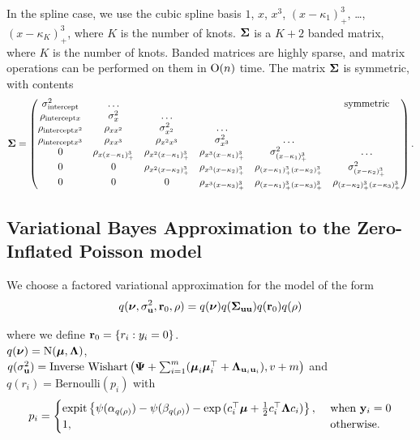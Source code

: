 
In the spline case, we use the cubic spline basis $1$, $x$, $x^3$, $(x - \kappa_1)^3_+$, \ldots, $(x -
\kappa_K)^3_+$, where $K$ is the number of knots. ${\boldsymbol \Sigma}$ is a $K + 2$ banded matrix, where $K$ is the
number of knots. Banded matrices are highly sparse, and matrix operations can be performed on them in
$\text{O}(n)$ time. The matrix ${\boldsymbol \Sigma}$ is symmetric, with contents
\[
	{\boldsymbol \Sigma} =
	\begin{pmatrix}
		\sigma^2_{\text{intercept}} & \ldots                      &                             &                               &                                          & \text{symmetric}              \\
		\rho_{\text{intercept} x} & \sigma^2_x & \ldots\\
		\rho_{\text{intercept} x^2} & \rho_{x x^2} & \sigma^2_{x^2} & \ldots \\
		\rho_{\text{intercept} x^3} & \rho_{x x^3} & \rho_{x^2 x^3} & \sigma^2_{x^3} & \ldots \\
		0                           & \rho_{x (x - \kappa_1)^3_+} & \rho_{x^2 (x-\kappa_1)_+^3} & \rho_{x^3 (x - \kappa_1)_+^3} & \sigma^2_{(x - \kappa_1)_+^3}            & \ldots                        \\
		0                           & 0                           & \rho_{x^2 (x-\kappa_2)_+^3} & \rho_{x^3 (x-\kappa_2)_+^3}   & \rho_{(x-\kappa_1)_+^3 (x-\kappa_2)_+^3} & \sigma^2_{(x - \kappa_2)_+^3} \\
		0 & 0 & 0 & \rho_{x^3 (x - \kappa_3)_+^3} & \rho_{(x - \kappa_1)_+^3 (x - \kappa_3)_+^3} & \rho_{(x - \kappa_2)_+^3 (x - \kappa_3)_+^3}
	\end{pmatrix}.
\]

\subsection{Variational Bayes Approximation to the Zero-Inflated Poisson model}

We choose a factored variational approximation for the model of the form 
\[
	q({\boldsymbol \nu}, \sigma_{{\bf u}}^2,{\bf r}_0, \rho) = q({\boldsymbol \nu}) q({\boldsymbol \Sigma}_{{\bf u} {\bf u}}) q({\bf r}_0) q(\rho)
\]

\noindent 
where we define ${\bf r}_0 = \{ r_i : y_i = 0 \}$. \\
$q({\boldsymbol \nu}) = \text{N}({\boldsymbol \mu}, {\boldsymbol \Lambda})$, \\
$q(\sigma_{{\bf u}}^2) = \text{Inverse Wishart}\left({\boldsymbol \Psi} + \sum_{i=1}^m ({\boldsymbol \mu}_i {\boldsymbol \mu}_i^\top + {\boldsymbol \Lambda}_{{\bf u}_i {\bf u}_i}), v + m \right)$ \mbox{and } \\
$q(r_i) = \text{Bernoulli}{(p_i)}$ with
$$p_i = 
\begin{cases}
\text{expit}\left\{ \psi{(\alpha_{q(\rho)})} - \psi{(\beta_{q(\rho)})} - \exp{(c_i^\top{\boldsymbol\mu}+ \frac{1}{2} c_i^\top {\boldsymbol\Lambda}c_i)} \right\},& \text{ when } {\bf y}_i = 0\\
1,& \text{ otherwise.}
\end{cases}$$

